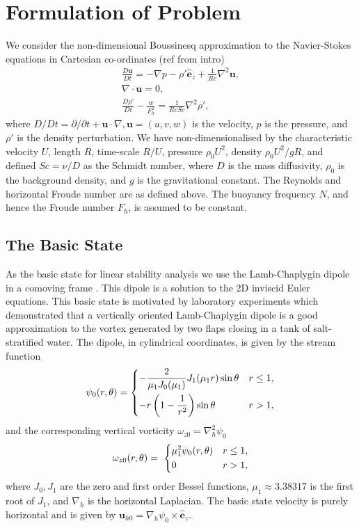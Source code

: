 \section{Formulation of Problem}
We consider the non-dimensional Boussinesq approximation to the Navier-Stokes equations in Cartesian co-ordinates (ref from intro)
\begin{align}
\frac{D\bm{u}}{Dt} = -\nabla p - \rho'\hat{\bm{e}}_{z} + \frac{1}{Re}\nabla^{2} \bm{u},\\
\nabla \cdot \bm{u}=0,\\
\frac{D\rho'}{Dt} -\frac{w}{F_{h}^{2}} = \frac{1}{ReSc}\nabla^{2} \rho',
\end{align}
where $D/Dt=\partial/\partial t + \bm{u}\cdot \nabla, \bm{u}=(u,v,w)$ is the velocity, $p$ is the pressure, and $\rho'$ is the density perturbation. We have non-dimensionalised by the characteristic velocity $U$, length $R$, time-scale $R/U$, pressure $\rho_{0}U^{2}$, density $\rho_{0}U^{2}/gR$, and defined $Sc=\nu /D$ as the Schmidt number, where $D$ is the mass diffusivity, $\rho_{0}$ is the background density, and $g$ is the gravitational constant. The Reynolds and horizontal Froude number are as defined above. The buoyancy frequency $N$, and hence the Froude number $F_{h}$, is assumed to be constant. 

\subsection{The Basic State}

As the basic state for linear stability analysis we use the Lamb-Chaplygin dipole in a comoving frame \cite{meleshko1994}. This dipole is a solution to the 2D inviscid Euler equations. This basic state is motivated by laboratory experiments \cite{bc2000a,leweke1998} which demonstrated that a vertically oriented Lamb-Chaplygin dipole is a good approximation to the vortex generated by two flaps closing in a tank of salt-stratified water. The dipole, in cylindrical coordinates, is given by the stream function
\begin{align}
\psi_{0}(r,\theta) = 
\begin{dcases}
-\frac{2}{\mu_{1}J_{0}(\mu_{1})}J_{1}(\mu_{1}r)\sin\theta & r\le 1,\\
-r\left(1-\frac{1}{r^{2}}\right)\sin\theta & r>1 ,
\end{dcases}
\end{align}
and the corresponding vertical vorticity $\omega_{z0}=\nabla_{h}^{2}\psi_{0}$
\begin{align}
\omega_{z0}(r,\theta) = \
\begin{dcases}
\mu_{1}^{2}\psi_{0}(r,\theta) & r\le 1,\\
0 & r>1,
\end{dcases}
\end{align}
where $J_{0},J_{1}$ are the zero and first order Bessel functions, $\mu_{1}\approx 3.38317$ is the first root of $J_{1}$, and $\nabla_{h}$ is the horizontal Laplacian. The basic state velocity is purely horizontal and is given by $\bm{u}_{h0}=\nabla_{h}\psi_{0}\times\hat{\bm{e}}_{z}$.

